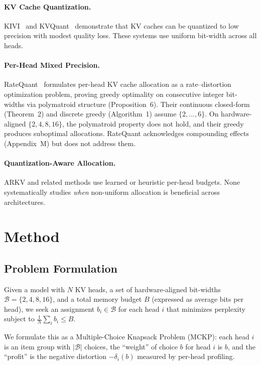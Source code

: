 \documentclass[11pt,a4paper]{article}
\begin{document}
\paragraph{KV Cache Quantization.}
KIVI~\cite{kivi2024} and KVQuant~\cite{kvquant2024} demonstrate that KV caches can be quantized to low precision with modest quality loss. These systems use uniform bit-width across all heads.

\paragraph{Per-Head Mixed Precision.}
RateQuant~\cite{ratequant2026} formulates per-head KV cache allocation as a rate--distortion optimization problem, proving greedy optimality on consecutive integer bit-widths via polymatroid structure (Proposition~6). Their continuous closed-form (Theorem~2) and discrete greedy (Algorithm~1) assume $\{2,\ldots,6\}$. On hardware-aligned $\{2,4,8,16\}$, the polymatroid property does not hold, and their greedy produces suboptimal allocations. RateQuant acknowledges compounding effects (Appendix~M) but does not address them.

\paragraph{Quantization-Aware Allocation.}
ARKV and related methods use learned or heuristic per-head budgets. None systematically studies \emph{when} non-uniform allocation is beneficial across architectures.

\section{Method}

\subsection{Problem Formulation}

Given a model with $N$ KV heads, a set of hardware-aligned bit-widths $\mathcal{B} = \{2, 4, 8, 16\}$, and a total memory budget $B$ (expressed as average bits per head), we seek an assignment $b_i \in \mathcal{B}$ for each head $i$ that minimizes perplexity subject to $\frac{1}{N}\sum_i b_i \leq B$.

We formulate this as a Multiple-Choice Knapsack Problem (MCKP): each head $i$ is an item group with $|\mathcal{B}|$ choices, the ``weight'' of choice $b$ for head $i$ is $b$, and the ``profit'' is the negative distortion $-\delta_i(b)$ measured by per-head profiling.
\end{document}
